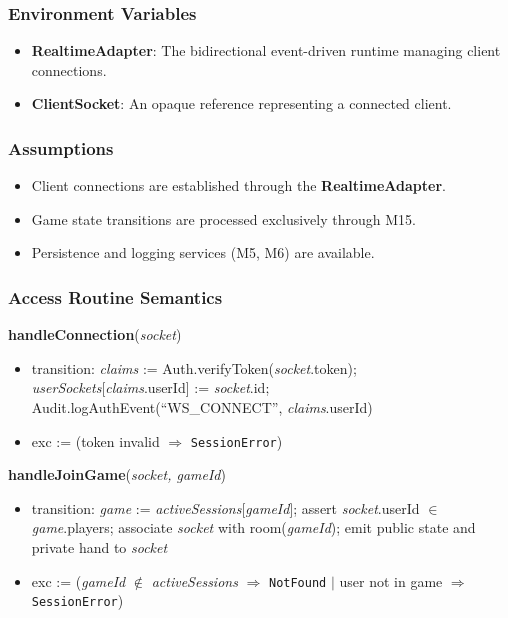 \documentclass[12pt, titlepage]{article}
\begin{document}
\subsubsection{Environment Variables}
\begin{itemize}
    \item \textbf{RealtimeAdapter}: The bidirectional event-driven runtime managing client connections.
    \item \textbf{ClientSocket}: An opaque reference representing a connected client.
\end{itemize}

\subsubsection{Assumptions}
\begin{itemize}
    \item Client connections are established through the \textbf{RealtimeAdapter}.
    \item Game state transitions are processed exclusively through M15.
    \item Persistence and logging services (M5, M6) are available.
\end{itemize}

\subsubsection{Access Routine Semantics}

\noindent\textbf{handleConnection}(\textit{socket})
\begin{itemize}
    \item transition: \textit{claims} := Auth.verifyToken(\textit{socket}.token); \textit{userSockets}[\textit{claims}.userId] := \textit{socket}.id; Audit.logAuthEvent(``WS\_CONNECT'', \textit{claims}.userId)
    \item exc := (token invalid $\Rightarrow$ \texttt{SessionError})
\end{itemize}

\noindent\textbf{handleJoinGame}(\textit{socket, gameId})
\begin{itemize}
    \item transition: \textit{game} := \textit{activeSessions}[\textit{gameId}]; assert \textit{socket}.userId $\in$ \textit{game}.players; associate \textit{socket} with room(\textit{gameId}); emit public state and private hand to \textit{socket}
    \item exc := (\textit{gameId} $\notin$ \textit{activeSessions} $\Rightarrow$ \texttt{NotFound} $|$ user not in game $\Rightarrow$ \texttt{SessionError})
\end{itemize}
\end{document}
